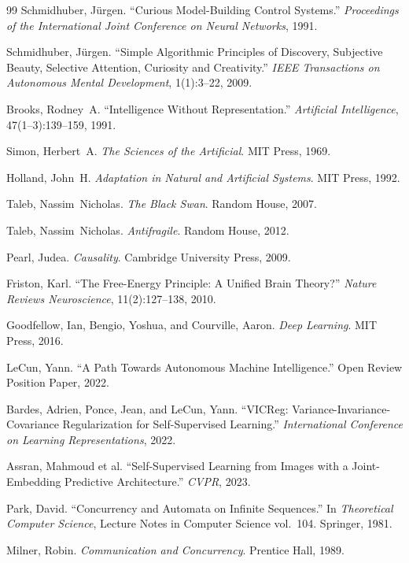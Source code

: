 \documentclass[12pt,a4paper]{article}
\theoremstyle{plain}
\theoremstyle{definition}
\theoremstyle{remark}
\begin{document}
\begin{thebibliography}{99}
Schmidhuber, J\"{u}rgen.
``Curious Model-Building Control Systems.''
\textit{Proceedings of the International Joint Conference on Neural Networks},
1991.

Schmidhuber, J\"{u}rgen.
``Simple Algorithmic Principles of Discovery, Subjective Beauty, Selective
Attention, Curiosity and Creativity.''
\textit{IEEE Transactions on Autonomous Mental Development}, 1(1):3--22, 2009.

Brooks, Rodney~A.
``Intelligence Without Representation.''
\textit{Artificial Intelligence}, 47(1--3):139--159, 1991.

Simon, Herbert~A.
\textit{The Sciences of the Artificial}.
MIT Press, 1969.

Holland, John~H.
\textit{Adaptation in Natural and Artificial Systems}.
MIT Press, 1992.

Taleb, Nassim~Nicholas.
\textit{The Black Swan}.
Random House, 2007.

Taleb, Nassim~Nicholas.
\textit{Antifragile}.
Random House, 2012.

Pearl, Judea.
\textit{Causality}.
Cambridge University Press, 2009.

Friston, Karl.
``The Free-Energy Principle: A Unified Brain Theory?''
\textit{Nature Reviews Neuroscience}, 11(2):127--138, 2010.

Goodfellow, Ian, Bengio, Yoshua, and Courville, Aaron.
\textit{Deep Learning}.
MIT Press, 2016.

LeCun, Yann.
``A Path Towards Autonomous Machine Intelligence.''
Open Review Position Paper, 2022.

Bardes, Adrien, Ponce, Jean, and LeCun, Yann.
``VICReg: Variance-Invariance-Covariance Regularization for Self-Supervised
Learning.''
\textit{International Conference on Learning Representations}, 2022.

Assran, Mahmoud et al.
``Self-Supervised Learning from Images with a Joint-Embedding Predictive
Architecture.''
\textit{CVPR}, 2023.

Park, David.
``Concurrency and Automata on Infinite Sequences.''
In \textit{Theoretical Computer Science}, Lecture Notes in Computer Science
vol.~104. Springer, 1981.

Milner, Robin.
\textit{Communication and Concurrency}.
Prentice Hall, 1989.


\end{thebibliography}
\end{document}
